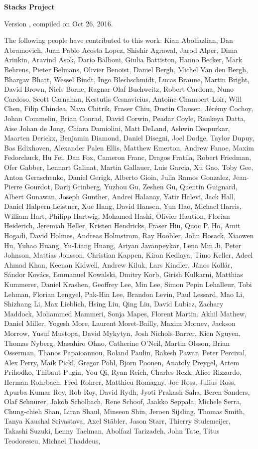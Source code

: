 \documentclass{stacks-project-book}
\theoremstyle{plain}
\theoremstyle{definition}
\theoremstyle{remark}
\numberwithin{equation}{subsection}
\begin{document}
\begin{titlepage}
\pagestyle{empty}
\setcounter{page}{1}
\centerline{\LARGE\bfseries Stacks Project}
\vskip1in
\noindent
\centerline{
Version , compiled on Oct 26, 2016.
}
\vskip1in
\noindent
The following people have contributed to this work:
Kian Abolfazlian, Dan Abramovich, Juan Pablo Acosta Lopez, Shishir Agrawal, Jarod Alper, Dima Arinkin, Aravind Asok, Dario Balboni, Giulia Battiston, Hanno Becker, Mark Behrens, Pieter Belmans, Olivier Benoist, Daniel Bergh, Michel Van den Bergh, Bhargav Bhatt, Wessel Bindt, Ingo Blechschmidt, Lucas Braune, Martin Bright, David Brown, Niels Borne, Ragnar-Olaf Buchweitz, Robert Cardona, Nuno Cardoso, Scott Carnahan, Kestutis Cesnavicius, Antoine Chambert-Loir, Will Chen, Filip Chindea, Nava Chitrik, Fraser Chiu, Dustin Clausen, J\'er\'emy Cochoy, Johan Commelin, Brian Conrad, David Corwin, Peadar Coyle, Rankeya Datta, Aise Johan de Jong, Chiara Damiolini, Matt DeLand, Ashwin Deopurkar, Maarten Derickx, Benjamin Diamond, Daniel Disegni, Joel Dodge, Taylor Dupuy, Bas Edixhoven, Alexander Palen Ellis, Matthew Emerton, Andrew Fanoe, Maxim Fedorchuck, Hu Fei, Dan Fox, Cameron Franc, Dragos Fratila, Robert Friedman, Ofer Gabber, Lennart Galinat, Martin Gallauer, Luis Garcia, Xu Gao, Toby Gee, Anton Geraschenko, Daniel Gerigk, Alberto Gioia, Julia Ramos Gonzalez, Jean-Pierre Gourdot, Darij Grinberg, Yuzhou Gu, Zeshen Gu, Quentin Guignard, Albert Gunawan, Joseph Gunther, Andrei Halanay, Yatir Halevi, Jack Hall, Daniel Halpern-Leistner, Xue Hang, David Hansen, Yun Hao, Michael Harris, William Hart, Philipp Hartwig, Mohamed Hashi, Olivier Haution, Florian Heiderich, Jeremiah Heller, Kristen Hendricks, Fraser Hiu, Quoc P. Ho, Amit Hogadi, David Holmes, Andreas Holmstrom, Ray Hoobler, John Hosack, Xiaowen Hu, Yuhao Huang, Yu-Liang Huang, Ariyan Javanpeykar, Lena Min Ji, Peter Johnson, Mattias Jonsson, Christian Kappen, Kiran Kedlaya, Timo Keller, Adeel Ahmad Khan, Keenan Kidwell, Andrew Kiluk, Lars Kindler, J\'anos Koll\'ar, S\'andor Kov\'acs, Emmanuel Kowalski, Dmitry Korb, Girish Kulkarni, Matthias Kummerer, Daniel Krashen, Geoffrey Lee, Min Lee, Simon Pepin Lehalleur, Tobi Lehman, Florian Lengyel, Pak-Hin Lee, Brandon Levin, Paul Lessard, Mao Li, Shizhang Li, Max Lieblich, Hsing Liu, Qing Liu, David Lubicz, Zachary Maddock, Mohammed Mammeri, Sonja Mapes, Florent Martin, Akhil Mathew, Daniel Miller, Yogesh More, Laurent Moret-Bailly, Maxim Mornev, Jackson Morrow, Yusuf Mustopa, David Mykytyn, Josh Nichols-Barrer, Kien Nguyen, Thomas Nyberg, Masahiro Ohno, Catherine O'Neil, Martin Olsson, Brian Osserman, Thanos Papaioannou, Roland Paulin, Rakesh Pawar, Peter Percival, Alex Perry, Maik Pickl, Gregor Pohl, Bjorn Poonen, Anatoly Preygel, Artem Prihodko, Thibaut Pugin, You Qi, Ryan Reich, Charles Rezk, Alice Rizzardo, Herman Rohrbach, Fred Rohrer, Matthieu Romagny, Joe Ross, Julius Ross, Apurba Kumar Roy, Rob Roy, David Rydh, Jyoti Prakash Saha, Beren Sanders, Olaf Schn\"urer, Jakob Scholbach, Rene Schoof, Jaakko Seppala, Michele Serra, Chung-chieh Shan, Liran Shaul, Minseon Shin, Jeroen Sijsling, Thomas Smith, Tanya Kaushal Srivastava, Axel St\"abler, Jason Starr, Thierry Stulemeijer, Takashi Suzuki, Lenny Taelman, Abolfazl Tarizadeh, John Tate, Titus Teodorescu, Michael Thaddeus, 
\end{titlepage}
\end{document}
